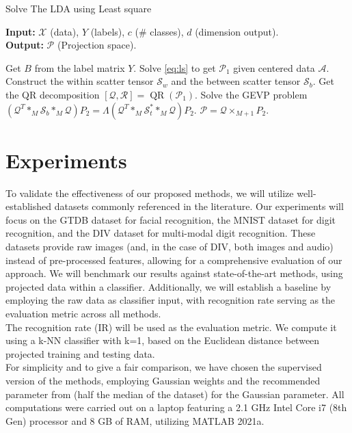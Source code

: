 \documentclass{siamltex}
\begin{document}
\begin{algorithm}[H]
\caption{Solve The LDA using Least square}
\label{algo:lda_ls}
\hspace*{\algorithmicindent} \textbf{Input:} $\mathcal{X}$ (data), $Y$ (labels), $c$ ($\#$ classes), $d$ (dimension output).\\
\hspace*{\algorithmicindent} \textbf{Output:} $\mathcal{P}$ (Projection space).
\begin{algorithmic}[1]
\State Get $B$ from the label matrix $Y$. 
\State Solve \ref{eq:ls} to get $\mathcal{P}_1$ given centered data $\mathcal{A}$.
\State Construct the within scatter tensor $\mathcal{S}_w$ and the between scatter tensor $\mathcal{S}_b$.
\State Get the QR decomposition $[\mathcal{Q}, \mathcal{R}] = \operatorname{QR}( \mathcal{P}_1)$.
\State Solve the GEVP problem $ \left(\mathcal{Q}^T *_M \mathcal{S}_b *_M \mathcal{Q} \right) P_2 = \Lambda \left(\mathcal{Q}^T *_M \mathcal{S}_{t}^* *_M \mathcal{Q} \right) P_2$.
\State $\mathcal{P}=\mathcal{Q} \times_{M+1} P_2$.
\end{algorithmic}
\end{algorithm}

\section{Experiments}\label{sec:experiments}
To validate the effectiveness of our proposed methods, we will utilize well-established datasets commonly referenced in the literature. Our experiments will focus on the GTDB dataset for facial recognition, the MNIST dataset for digit recognition, and the DIV dataset for multi-modal digit recognition. These datasets provide raw images (and, in the case of DIV, both images and audio) instead of pre-processed features, allowing for a comprehensive evaluation of our approach. We will benchmark our results against state-of-the-art methods, using projected data within a classifier. Additionally, we will establish a baseline by employing the raw data as classifier input, with recognition rate serving as the evaluation metric across all methods.\\
The recognition rate (IR) will be used as the evaluation metric. We compute it using a k-NN classifier with k=1, based on the Euclidean distance between projected training and testing data. \\
For simplicity and to give a fair comparison, we have chosen the supervised version of the methods, employing Gaussian weights and the recommended parameter from \cite{kokiopoulou2009enhanced} (half the median of the dataset) for the Gaussian parameter. All computations were carried out on a laptop featuring a 2.1 GHz Intel Core i7 (8th Gen) processor and 8 GB of RAM, utilizing MATLAB 2021a.
\end{document}
